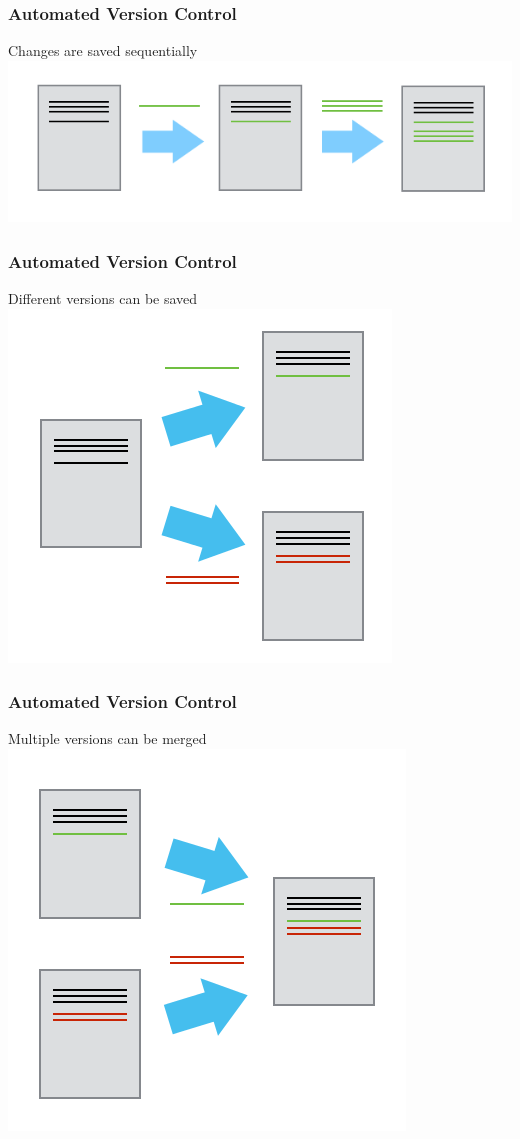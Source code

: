 \documentclass{beamer}
\begin{document}
\begin{frame}
\frametitle{Automated Version Control}
\begin{block}{Changes are saved sequentially}
\includegraphics[scale=0.65]{fig/play-changes.png}
\end{block}
\end{frame}

\begin{frame}
\frametitle{Automated Version Control}
\begin{block}{Different versions can be saved}
\includegraphics[scale=0.8]{fig/versions.png}
\end{block}
\end{frame}

\begin{frame}
\frametitle{Automated Version Control}
\begin{block}{Multiple versions can be merged}
\includegraphics[scale=0.8]{fig/merge.png}
\end{block}
\end{frame}
\end{document}
